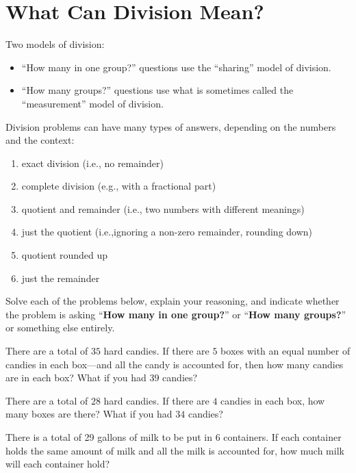 \newpage
\section{What Can Division Mean?}\label{A:dm}
\begin{teachingnote}
Two models of division:  
\begin{itemize}
\item ``How many in one group?'' questions use the ``sharing'' model of division.  
\item ``How many groups?'' questions use what is sometimes called the ``measurement'' model of division.  
\end{itemize}
Division problems can have many types of answers, depending on the numbers and the context:
\begin{enumerate}
\item exact division (i.e., no remainder)
\item complete division (e.g., with a fractional part)
\item quotient and remainder (i.e., two numbers with different meanings)
\item just the quotient (i.e.,ignoring a non-zero remainder, rounding down)
\item quotient rounded up 
\item just the remainder
\end{enumerate}
\end{teachingnote}
Solve each of the problems below, explain your reasoning, and indicate whether the problem is asking ``\textbf{How many in one group?}'' or ``\textbf{How many groups?}'' or something else entirely.

\begin{prob}
There are a total of $35$ hard candies. If there are $5$ boxes with an
equal number of candies in each box---and all the candy is accounted
for, then how many candies are in each box? What if you had $39$
candies?
\end{prob}

\begin{prob}
There are a total of $28$ hard candies. If there are $4$ candies in
each box, how many boxes are there? What if you had $34$ candies?
\end{prob}


\begin{prob}
There is a total of 29 gallons of milk to be put in 6 containers.  If
each container holds the same amount of milk and all the milk is
accounted for, how much milk will each container hold?
\end{prob}

